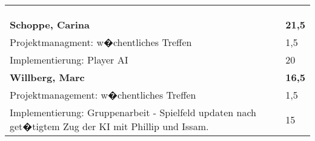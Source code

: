 \documentclass[a4paper,11pt]{scrartcl}
\begin{document}
\begin{longtable}{| p{13.8cm} | C{2.4cm} |}
	&

	\\
	\hline


	&

	\\
	\hline


	&

	\\
	\hline


	&

	\\
	\hline
	\hline


	\textbf{Schoppe, Carina} & \textbf{21,5}\\ %
	\hline

  Projektmanagment: w�chentliches Treffen
	&
  1,5
	\\
	\hline

  Implementierung: Player AI
	&
  20
	\\
	\hline
	\hline


	\textbf{Willberg, Marc} & \textbf{16,5}\\ %
	\hline

  Projektmanagement: w�chentliches Treffen
	&
  1,5
	\\
	\hline

  Implementierung: Gruppenarbeit - Spielfeld updaten nach get�tigtem Zug der KI mit Phillip und Issam.
	&
  15
	\\
	\hline

\end{longtable}
\end{document}
